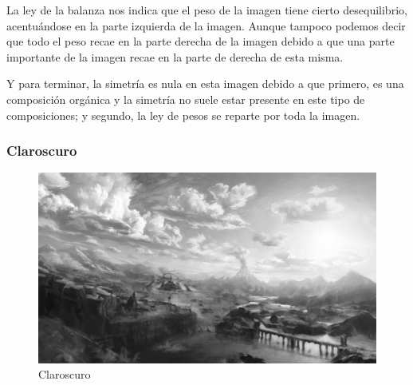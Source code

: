 \documentclass[12pt]{article}
\begin{document}
          La ley de la balanza nos indica que el peso de la imagen tiene cierto desequilibrio, acentuándose en la parte izquierda de la imagen.
          Aunque tampoco podemos decir que todo el peso recae en la parte derecha de la imagen debido a que una parte importante de la imagen recae en la parte de derecha de esta misma. 

          Y para terminar, la simetría es nula en esta imagen debido a que primero, es una composición orgánica y la simetría no suele estar presente en este tipo de composiciones; y segundo, la ley de pesos se reparte por toda la imagen. 
          \newpage
        \subsubsection{Claroscuro}
          \begin{figure}[H]
            \centering
            \includegraphics[width=\textwidth]{Jesus/Seccion2/Clarocuro.jpg}
            \caption{Claroscuro}
          \end{figure}
\end{document}
